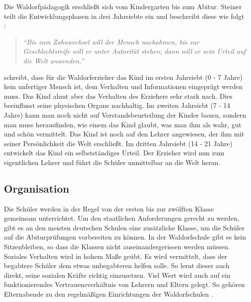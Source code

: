 Die Waldorfpädagogik erschließt sich vom Kindergarten bis zum Abitur. Steiner teilt die Entwicklungsphasen in drei Jahrsiebte ein und beschreibt diese wie folgt \citep[S. 139]{steiner10}:

\begin{quotation}
			\emph{\enquote{Bis zum Zahnwechsel will der Mensch nachahmen, bis zur Geschlechtsreife will er unter Autorität stehen; dann will er sein Urteil auf die Welt anwenden.}}
\end{quotation}

\citet{kiersch07} schreibt, dass für die Waldorferzieher das Kind im ersten Jahrsiebt (0 - 7 Jahre) kein unfertiger Mensch ist, dem Verhalten und Informationen eingeprägt werden muss. Das Kind ahmt aber das Verhalten des Erziehers sehr stark nach. Dies beeinflusst seine physischen Organe nachhaltig. Im zweiten Jahrsiebt (7 - 14 Jahre) kann man noch nicht auf Verstandsbeurteilung der Kinder bauen, sondern man muss herausfinden, wie einem das Kind glaubt, was man ihm als wahr, gut und schön vermittelt. Das Kind ist noch auf den Lehrer angewiesen, der ihm mit seiner Persönlichkeit die Welt erschließt. Im dritten Jahrsiebt (14 - 21 Jahre) entwickelt das Kind ein selbstständiges Urteil. Der Erzieher wird nun zum eigentlichen Lehrer und führt die Schüler unmittelbar an die Welt heran. 

\subsection{Organisation} %
\label{sub:organisation}

Die Schüler werden in der Regel von der ersten bis zur zwölften Klasse gemeinsam unterrichtet. Um den staatlichen Anforderungen gerecht zu werden, gibt es an den meisten deutschen Schulen eine zusätzliche Klasse, um die Schüler auf die Abiturprüfungen vorbereiten zu können. In der Waldorfschule gibt es kein Sitzenbleiben, so dass die Klassen nicht auseinandergerissen werden müssen. Soziales Verhalten wird in hohem Maße geübt. Es wird vermittelt, dass der begabtere Schüler dem etwas unbegabteren helfen solle. So lernt dieser auch direkt, seine sozialen Kräfte richtig einzusetzen. Viel Wert wird auch auf ein funktionierendes Vertrauensverhältnis von Lehrern und Eltern gelegt. So gehören Elternabende zu den regelmäßigen Einrichtungen der Waldorfschulen \citep[vgl.][]{kiersch07, hemleben63}.

